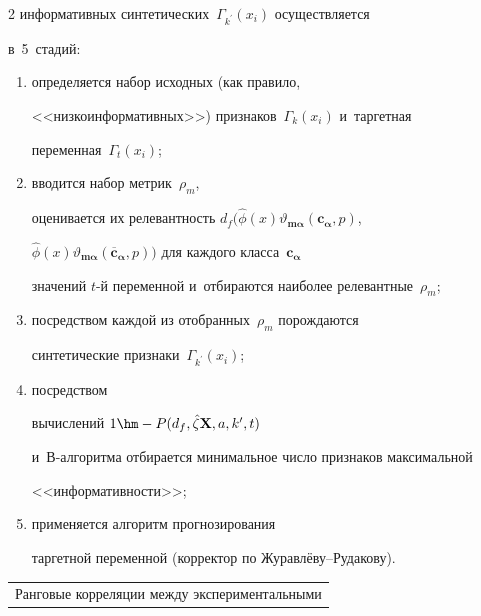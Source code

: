 \begin{multicols}{2}
информативных синтетических~$\Gamma_{k^\prime}(x_i)$ осуществляется 

в~5~стадий: 

\begin{enumerate}[(1)]

\item определяется набор исходных (как правило, 

<<низкоинформативных>>) признаков~$\Gamma_k(x_i)$ и~таргетная 

переменная~$\Gamma_t(x_i)$;

\item вводится набор метрик~$\rho_m$, 

оценивается их релевантность $d_f(\hat{\phi}(x)\vartheta_{\mathbf{m}{\bm 

\alpha}}(\mathbf{c}_{\bm \alpha},{p})$,\linebreak 

$\hat{\phi}(x)\vartheta_{\mathbf{m}{\bm \alpha}}(\overline{\mathbf{c}}_{\bm 

\alpha}, {p}))$ для каждого класса~$\mathbf{c}_{\bm \alpha}$ 

значений $t$-й переменной и~отбираются наиболее релевантные~$\rho_m$; 

\item посредством каждой из отобранных~$\rho_m$ по\-рож\-да\-ют\-ся 

синтетические признаки~$\Gamma_{k^\prime}(x_i)$;

\item посредством 

вычислений $1\hm- P(d_f, \hat{\zeta}\mathbf{X}, a, k^\prime, t)$  

и~В-ал\-го\-рит\-ма отбирается минимальное чис\-ло признаков максимальной 

<<ин\-фор\-ма\-тив\-ности>>;

\item применяется алгоритм прогнозирования 

таргетной переменной (корректор по Жу\-рав\-лё\-ву--Ру\-да\-кову). 

\end{enumerate}



\begin{table}\small

\begin{center}

\begin{tabular}{|l|c|c|}

\multicolumn{3}{p{140mm}}{Ранговые корреляции между экспериментальными 

}
\end{tabular}
\end{center}
\end{table}
\end{multicols}
